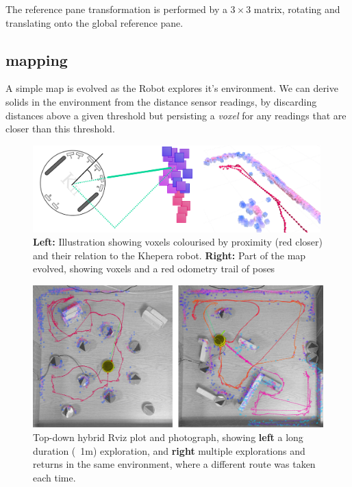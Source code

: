 \documentclass[11pt, a4paper]{article}
\begin{document}
The reference pane transformation is performed by a ${3\times3}$ matrix, rotating and translating
onto the global reference pane.

\subsection{mapping}

A simple map is evolved as the Robot explores it's environment. We can derive solids in the environment
from the distance sensor readings, by discarding distances above a given threshold but persisting a
\textit{voxel} for any readings that are closer than this threshold.

\begin{figure}[h]
  \begin{center}
    \includegraphics[width=30em]{../assets/khepera-wall.png}
  \end{center}
  \caption{\textbf{Left:} Illustration showing voxels colourised by proximity (red closer) and their
    relation to the Khepera robot. \textbf{Right:} Part of the map evolved, showing voxels and a
    red odometry trail of poses}
\end{figure}



\begin{figure}[h]
  \begin{center}
    \includegraphics[width=38em]{../assets/merged_top_fig.png}
  \end{center}
  \caption{Top-down hybrid Rviz plot and photograph, showing \textbf{left} a long duration (~1m)
    exploration, and \textbf{right} multiple explorations and returns in the same environment, where a
    different route was taken each time.}
\end{figure}
\end{document}

